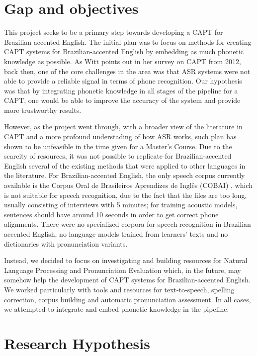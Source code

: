 \section*{Gap and objectives} 

This project seeks to be a primary step towards developing a \ac{CAPT} for Brazilian-accented English. The initial plan was to focus on methods for creating \ac{CAPT} systems for Brazilian-accented English by embedding as much phonetic knowledge as possible. As Witt \citep{Witt2012} points out in her survey on \ac{CAPT} from 2012, back then, one of the core challenges in the area was that \ac{ASR} systems were not able to provide a reliable signal in terms of phone recognition. Our hypothesis was that by integrating phonetic knowledge in all stages of the pipeline for a \ac{CAPT}, one would be able to improve the accuracy of the system and provide more trustworthy results.

However, as the project went through, with a broader view of the literature in \ac{CAPT} and a more profound understading of how \ac{ASR} works, such plan has shown to be unfeasible in the time given for a Master's Course. Due to the scarcity of resources, it was not possible to replicate for Brazilian-accented English several of the existing methods that were applied to other languages in the literature. For Brazilian-accented English, the only speech corpus currently available is the Corpus Oral de Brasileiros Aprendizes de Ingl\^es (COBAI) \cite{Mello2012}, which is not suitable for speech recognition, due to the fact that the files are too long, usually consisting of interviews with 5 minutes; for training acoustic models, sentences should have around 10 seconds in order to get correct phone alignments. There were no specialized corpora for speech recognition in Brazilian-accented English, no language models trained from learners' texts and no dictionaries with pronunciation variants. 

Instead, we decided to focus on investigating and building resources for Natural Language Processing and Pronunciation Evaluation which, in the future, may somehow help the development of \ac{CAPT} systems for Brazilian-accented English. We worked particularly with tools and resources for text-to-speech, spelling correction, corpus building and automatic pronunciation assessment. In all cases, we attempted to integrate and embed phonetic knowledge in the pipeline.

\section*{Research Hypothesis}

